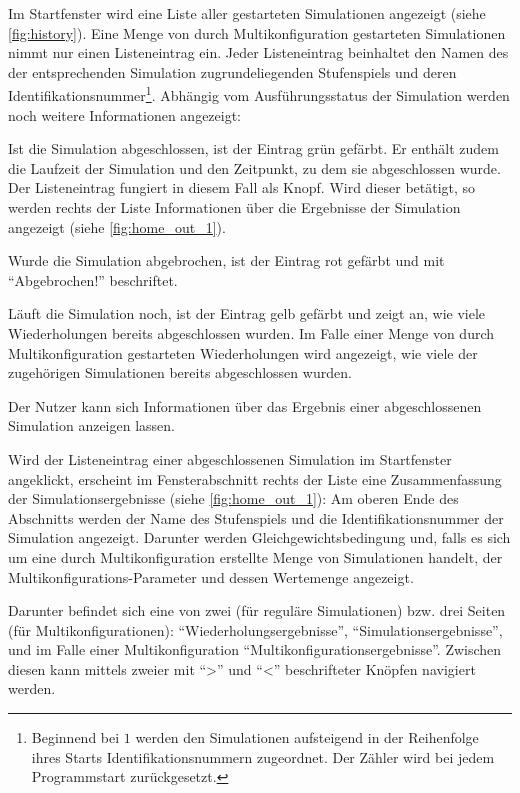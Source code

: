 \documentclass[parskip=full,11pt]{scrartcl}
\begin{document}
Im Startfenster wird eine Liste aller gestarteten Simulationen angezeigt (siehe \cref{fig:history}). Eine Menge von durch Multikonfiguration gestarteten Simulationen nimmt nur einen Listeneintrag ein. Jeder Listeneintrag beinhaltet den Namen des der entsprechenden Simulation zugrundeliegenden \Gls{Stufenspiel}s und deren Identifikationsnummer\footnote{Beginnend bei \(1\) werden den Simulationen aufsteigend in der Reihenfolge ihres Starts Identifikationsnummern zugeordnet. Der Zähler wird bei jedem Programmstart zurückgesetzt.}. Abhängig vom Ausführungsstatus der Simulation werden noch weitere Informationen angezeigt:

Ist die Simulation abgeschlossen, ist der Eintrag grün gefärbt. Er enthält zudem die Laufzeit der Simulation und den Zeitpunkt, zu dem sie abgeschlossen wurde. Der Listeneintrag fungiert in diesem Fall als Knopf. Wird dieser betätigt, so werden rechts der Liste Informationen über die Ergebnisse der Simulation angezeigt (siehe \cref{fig:home_out_1}).

Wurde die Simulation abgebrochen, ist der Eintrag rot gefärbt und mit \enquote{Abgebrochen!} beschriftet.

Läuft die Simulation noch, ist der Eintrag gelb gefärbt und zeigt an, wie viele Wiederholungen bereits abgeschlossen wurden. Im Falle einer Menge von durch Multikonfiguration gestarteten Wiederholungen wird angezeigt, wie viele der zugehörigen Simulationen bereits abgeschlossen wurden.

Der \Gls{Nutzer} kann sich Informationen über das Ergebnis einer abgeschlossenen Simulation anzeigen lassen.

Wird der Listeneintrag einer abgeschlossenen Simulation im Startfenster angeklickt, erscheint im Fensterabschnitt rechts der Liste eine Zusammenfassung der Simulationsergebnisse (siehe \cref{fig:home_out_1}): Am oberen Ende des Abschnitts werden der Name des \Gls{Stufenspiel}s und die Identifikationsnummer der Simulation angezeigt. Darunter werden Gleichgewichtsbedingung und, falls es sich um eine durch Multikonfiguration erstellte Menge von Simulationen handelt, der Multikonfigurations-Parameter und dessen Wertemenge angezeigt.

Darunter befindet sich eine von zwei (für reguläre Simulationen) bzw. drei Seiten (für Multikonfigurationen): \enquote{Wiederholungsergebnisse}, \enquote{Simulationsergebnisse}, und im Falle einer Multikonfiguration \enquote{Multikonfigurationsergebnisse}. Zwischen diesen kann mittels zweier mit \enquote{>} und \enquote{<} beschrifteter Knöpfen navigiert werden.
\end{document}
